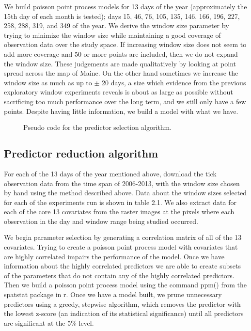 \noindent We build poisson point process models for 13 days of the year (approximately the 15th day of each month is tested); days 15, 46, 76, 105, 135, 146, 166, 196, 227, 258, 288, 319, and 349 of the year. We derive the window size parameter by trying to minimize the window size while maintaining a good coverage of observation data over the study space. If increasing window size does not seem to add more coverage and 50 or more points are included, then we do not expand the window size. These judgements are made qualitatively by looking at point spread across the map of Maine. On the other hand sometimes we increase the window size as much as up to $\pm$ 20 days, a size which evidence from the previous exploratory window experiments reveals is about as large as possible without sacrificing too much performance over the long term, and we still only have a few points. Despite having little information, we build a model with what we have.  \newline

\begin{figure} [!ht]
\centerline{}
\caption{Pseudo code for the predictor selection algorithm. }
\label{fig6}
\end{figure}
\subsection{ Predictor reduction algorithm}

For each of the 13 days of the year mentioned above, download the tick observation data from the time span of 2006-2013, with the window size chosen by hand using the method described above. Data about the window sizes selected for each of the experiments run is shown in table 2.1. We also extract data for each of the core 13 covariates from the raster images at the pixels where each observation in the day and window range being studied occurred. \newline

\noindent We begin parameter selection by generating a correlation matrix of all of the 13 covariates. Trying to create a poisson point process model with covariates that are highly correlated impairs the performance of the model. Once we have information about the highly correlated predictors we are able to create subsets of the parameters that do not contain any of the highly correlated predictors. Then we build a poisson point process model using the command ppm() from the spatstat package in r. Once we have a model built, we prune unnecessary predictors using a greedy, stepwise algorithm, which removes the predictor with the lowest z-score (an indication of its statistical significance) until all predictors are significant at the 5\% level.  \newline

